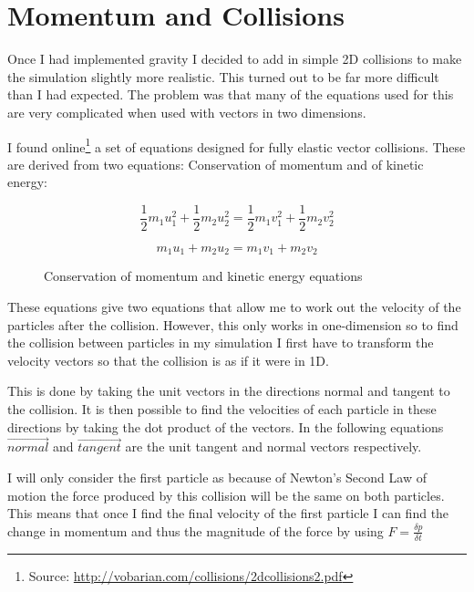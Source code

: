 \section{Momentum  and Collisions}
	Once I had implemented gravity I decided to add in simple 2D collisions to make the simulation slightly more realistic. This turned out to be far more difficult than I had expected. The problem was that many of the equations used for this are very complicated when used with vectors in two dimensions.
	
	I found online\footnote{Source: \url{http://vobarian.com/collisions/2dcollisions2.pdf}} a set of equations designed for fully elastic vector collisions. These are derived from two equations: Conservation of momentum and of kinetic energy:
	
	\begin{figure}[h]
		\begin{equation}
		\frac{1}{2}m_{1}u_{1}^2 + \frac{1}{2}m_{2}u_{2}^2 = \frac{1}{2}m_{1}v_{1}^2 + \frac{1}{2}m_{2}v_{2}^2
		\end{equation}
		
		\begin{equation}
		m_{1}u_{1} + m_{2}u_{2} = m_{1}v_{1} + m_{2}v_{2}
		\end{equation}
		\caption{Conservation of momentum and kinetic energy equations}
		\label{fig:movEqn}
	\end{figure}

	These equations give two equations that allow me to work out the velocity of the particles after the collision. However, this only works in one-dimension so to find the collision between particles in my simulation I first have to transform the velocity vectors so that the collision is as if it were in 1D. 
	
	This is done by taking the unit vectors in the directions normal and tangent to the collision. It is then possible to find the velocities of each particle in these directions by taking the dot product of the vectors. In the following equations $\vec{normal}$ and $\vec{tangent}$ are the unit tangent and normal vectors respectively.
	
	I will only consider the first particle as because of Newton's Second Law of motion the force produced by this collision will be the same on both particles. This means that once I find the final velocity of the first particle I can find the change in momentum and thus the magnitude of the force by using $F = \frac{\delta p}{\delta t}$
	
